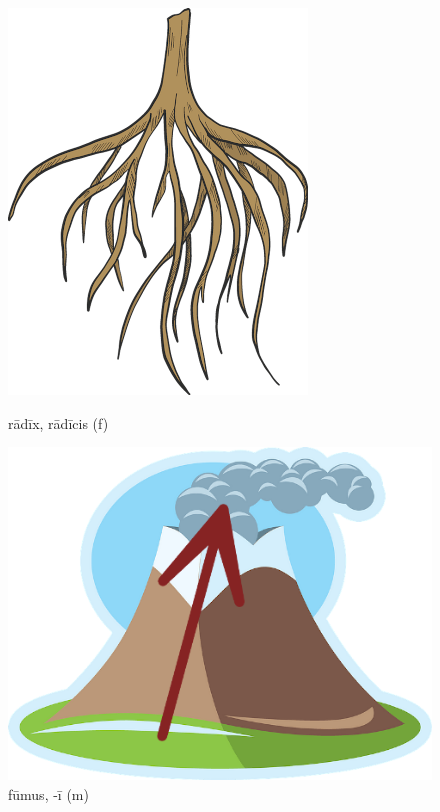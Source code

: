 \begin{figure}[hp]
    \begin{minipage}[hbp]{0.5\linewidth}
        \centering
        \includegraphics{root}
        \caption{rādīx, rādīcis (f)}
    \end{minipage}%
    \begin{minipage}[hbp]{0.5\linewidth}
        \centering
        \includegraphics{fumus}
        \caption{fūmus, -ī (m)}
    \end{minipage}
\end{figure}

